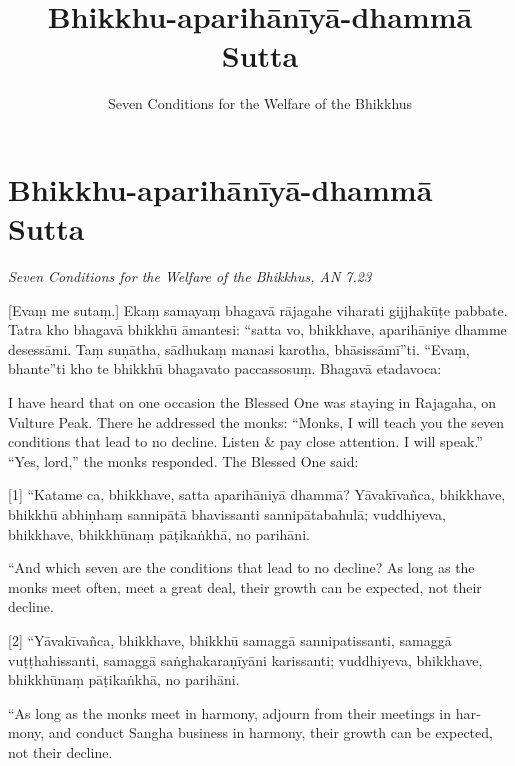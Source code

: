 \documentclass[
  babelLanguage=portuguese,
  final,
  a4Paper,
]{chantingbook}
\title{Bhikkhu-aparihānīyā-dhammā Sutta}
\subtitle{Seven Conditions for the Welfare of the Bhikkhus}
\begin{document}
\mainmatter

\eveningChapterSettings

\pagestyle{empty}

\chapter{Bhikkhu-aparihānīyā-dhammā Sutta}

\emph{Seven Conditions for the Welfare of the Bhikkhus, AN 7.23}

\begin{leader}
\end{leader}

[Evaṃ me sutaṃ.] Ekaṃ samayaṃ bhagavā rājagahe viharati gijjhakūṭe pabbate.
Tatra kho bhagavā bhikkhū āmantesi: “satta vo, bhikkhave, aparihāniye dhamme
desessāmi. Taṃ suṇātha, sādhukaṃ manasi karotha, bhāsissāmī”ti. “Evaṃ, bhante”ti
kho te bhikkhū bhagavato paccassosuṃ. Bhagavā etadavoca:

\begin{english}
  I have heard that on one occasion the Blessed One was staying in Rajagaha, on
  Vulture Peak. There he addressed the monks: “Monks, I will teach you the seven
  conditions that lead to no decline. Listen \& pay close attention. I will
  speak.” “Yes, lord,” the monks responded. The Blessed One said:
\end{english}

[1] “Katame ca, bhikkhave, satta aparihāniyā dhammā? Yāvakīvañca, bhikkhave, bhikkhū
abhiṇhaṃ sannipātā bhavissanti sannipātabahulā; vuddhiyeva, bhikkhave,
bhikkhūnaṃ pāṭikaṅkhā, no parihāni.

\begin{english}
  “And which seven are the conditions that lead to no decline? As long as the
  monks meet often, meet a great deal, their growth can be expected, not their
  decline.
\end{english}

[2] “Yāvakīvañca, bhikkhave, bhikkhū samaggā sannipatissanti, samaggā
vuṭṭhahissanti, samaggā saṅghakaraṇīyāni karissanti; vuddhiyeva, bhikkhave,
bhikkhūnaṃ pāṭikaṅkhā, no parihāni.

\begin{english}
  “As long as the monks meet in harmony, adjourn from their meetings in harmony,
  and conduct Sangha business in harmony, their growth can be expected, not
  their decline.
\end{english}
\end{document}
